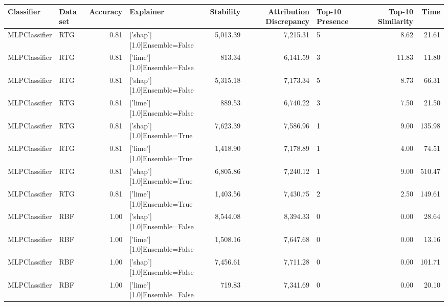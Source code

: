 \begin{tabular}{llrlrrlrr}
\toprule
   Classifier &       Data set &  Accuracy &                   Explainer &  Stability &  Attribution Discrepancy & Top-10 Presence &  Top-10 Similarity &     Time \\
\midrule
MLPClassifier &            RTG &      0.81 & ['shap'][1.0]Ensemble=False &   5,013.39 &                 7,215.31 &               5 &               8.62 &    21.61 \\
MLPClassifier &            RTG &      0.81 & ['lime'][1.0]Ensemble=False &     813.34 &                 6,141.59 &               3 &              11.83 &    11.80 \\
MLPClassifier &            RTG &      0.81 & ['shap'][1.0]Ensemble=False &   5,315.18 &                 7,173.34 &               5 &               8.73 &    66.31 \\
MLPClassifier &            RTG &      0.81 & ['lime'][1.0]Ensemble=False &     889.53 &                 6,740.22 &               3 &               7.50 &    21.50 \\
MLPClassifier &            RTG &      0.81 &  ['shap'][1.0]Ensemble=True &   7,623.39 &                 7,586.96 &               1 &               9.00 &   135.98 \\
MLPClassifier &            RTG &      0.81 &  ['lime'][1.0]Ensemble=True &   1,418.90 &                 7,178.89 &               1 &               4.00 &    74.51 \\
MLPClassifier &            RTG &      0.81 &  ['shap'][1.0]Ensemble=True &   6,805.86 &                 7,240.12 &               1 &               9.00 &   510.47 \\
MLPClassifier &            RTG &      0.81 &  ['lime'][1.0]Ensemble=True &   1,403.56 &                 7,430.75 &               2 &               2.50 &   149.61 \\
MLPClassifier &            RBF &      1.00 & ['shap'][1.0]Ensemble=False &   8,544.08 &                 8,394.33 &               0 &               0.00 &    28.64 \\
MLPClassifier &            RBF &      1.00 & ['lime'][1.0]Ensemble=False &   1,508.16 &                 7,647.68 &               0 &               0.00 &    13.16 \\
MLPClassifier &            RBF &      1.00 & ['shap'][1.0]Ensemble=False &   7,456.61 &                 7,711.28 &               0 &               0.00 &   101.71 \\
MLPClassifier &            RBF &      1.00 & ['lime'][1.0]Ensemble=False &     719.83 &                 7,341.69 &               0 &               0.00 &    20.10 \\

\end{tabular}
